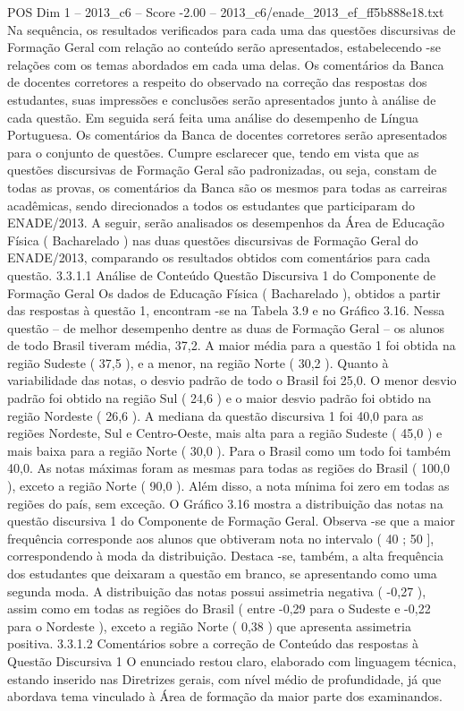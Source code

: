 \begin{textsample}{POS Dim 1 – 2013\_c6 – Score -2.00 – 2013\_c6/enade\_2013\_ef\_ff5b888e18.txt}
Na sequência, os resultados verificados para cada uma das questões discursivas de Formação Geral com relação ao conteúdo serão apresentados, estabelecendo -se relações com os temas abordados em cada uma delas.
Os comentários da Banca de docentes corretores a respeito do observado na correção das respostas dos estudantes, suas impressões e conclusões serão apresentados junto à análise de cada questão.
Em seguida será feita uma análise do desempenho de Língua Portuguesa.
Os comentários da Banca de docentes corretores serão apresentados para o conjunto de questões.
Cumpre esclarecer que, tendo em vista que as questões discursivas de Formação Geral são padronizadas, ou seja, constam de todas as provas, os comentários da Banca são os mesmos para todas as carreiras acadêmicas, sendo direcionados a todos os estudantes que participaram do ENADE/2013.
A seguir, serão analisados os desempenhos da Área de Educação Física ( Bacharelado ) nas duas questões discursivas de Formação Geral do ENADE/2013, comparando os resultados obtidos com comentários para cada questão. 3.3.1.1 Análise de Conteúdo Questão Discursiva 1 do Componente de Formação Geral Os dados de Educação Física ( Bacharelado ), obtidos a partir das respostas à questão 1, encontram -se na Tabela 3.9 e no Gráfico 3.16.
Nessa questão – de melhor desempenho dentre as duas de Formação Geral – os alunos de todo Brasil tiveram média, 37,2.
A maior média para a questão 1 foi obtida na região Sudeste ( 37,5 ), e a menor, na região Norte ( 30,2 ).
Quanto à variabilidade das notas, o desvio padrão de todo o Brasil foi 25,0.
O menor desvio padrão foi obtido na região Sul ( 24,6 ) e o maior desvio padrão foi obtido na região Nordeste ( 26,6 ).
A mediana da questão discursiva 1 foi 40,0 para as regiões Nordeste, Sul e Centro-Oeste, mais alta para a região Sudeste ( 45,0 ) e mais baixa para a região Norte ( 30,0 ).
Para o Brasil como um todo foi também 40,0.
As notas máximas foram as mesmas para todas as regiões do Brasil ( 100,0 ), exceto a região Norte ( 90,0 ).
Além disso, a nota mínima foi zero em todas as regiões do país, sem exceção.
O Gráfico 3.16 mostra a distribuição das notas na questão discursiva 1 do Componente de Formação Geral.
Observa -se que a maior frequência corresponde aos alunos que obtiveram nota no intervalo ( 40 ; 50 ], correspondendo à moda da distribuição.
Destaca -se, também, a alta frequência dos estudantes que deixaram a questão em branco, se apresentando como uma segunda moda.
A distribuição das notas possui assimetria negativa ( -0,27 ), assim como em todas as regiões do Brasil ( entre -0,29 para o Sudeste e -0,22 para o Nordeste ), exceto a região Norte ( 0,38 ) que apresenta assimetria positiva. 3.3.1.2 Comentários sobre a correção de Conteúdo das respostas à Questão Discursiva 1 O enunciado restou claro, elaborado com linguagem técnica, estando inserido nas Diretrizes gerais, com nível médio de profundidade, já que abordava tema vinculado à Área de formação da maior parte dos examinandos.

\end{textsample}
